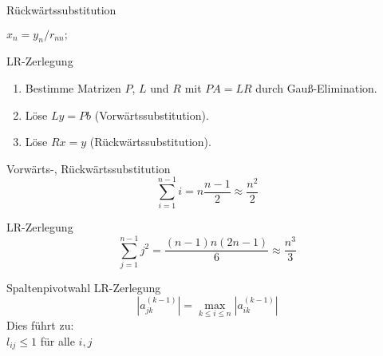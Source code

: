 
\begin{flashcard}[Algorithmus]{Rückwärtssubstitution}
\begin{algorithm}[H]
	$x_n = y_n/r_{nn};$\\
\end{algorithm}
\end{flashcard}

\begin{flashcard}[Algorithmus]{LR-Zerlegung}
\begin{enumerate}
	\item Bestimme Matrizen $P$, $L$ und $R$ mit $PA = LR$ durch Gauß-Elimination.
	\item Löse $Ly = Pb$ (Vorwärtssubstitution).
	\item Löse $Rx = y$ (Rückwärtssubstitution).
\end{enumerate}
\end{flashcard}

\begin{flashcard}[Aufwand]{Vorwärts-, Rückwärtssubstitution}
$$\sum_{i=1}^{n-1}i = n \frac{n-1}{2} \approx \frac{n^2}{2}$$
\end{flashcard}

\begin{flashcard}[Aufwand]{LR-Zerlegung}
$$\sum_{j=1}^{n-1}j^2 = \frac{(n-1)n(2n-1)}{6} \approx \frac{n^3}{3}$$
\end{flashcard}

\begin{flashcard}{Spaltenpivotwahl LR-Zerlegung}
$$|a_{jk}^{(k-1)}| = \max_{k \leq i \leq n} |a_{ik}^{(k-1)}|$$
Dies führt zu:\\
$l_{ij} \leq 1$ für alle $i, j$
\end{flashcard}